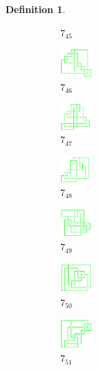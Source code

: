 \documentclass{article}
\theoremstyle{definition}
\newtheorem{defn}[thm]{Definition}
\theoremstyle{theorem}
\theoremstyle{proposition}
\theoremstyle{corollary}
\begin{document}
\begin{defn}
\begin{figure}[H]
\begin{subfigure}{0.075\textwidth}
    \caption{$7_{45}$} 
    \end{subfigure}
    \begin{subfigure}{0.075\textwidth}
    \includegraphics[width=1.25cm]{../Midterm_Poster/grid_diagram/theta_7_46.png}
    \caption{$7_{46}$} 
    \end{subfigure}
    \begin{subfigure}{0.075\textwidth}
    \includegraphics[width=1.25cm]{../Midterm_Poster/grid_diagram/theta_7_47.png}
    \caption{$7_{47}$} 
    \end{subfigure}
    \begin{subfigure}{0.075\textwidth}
    \includegraphics[width=1.25cm]{../Midterm_Poster/grid_diagram/theta_7_48.png}
    \caption{$7_{48}$} 
    \end{subfigure}
    \begin{subfigure}{0.075\textwidth}
    \includegraphics[width=1.25cm]{../Midterm_Poster/grid_diagram/theta_7_49.png}
    \caption{$7_{49}$} 
    \end{subfigure}
    \begin{subfigure}{0.075\textwidth}
    \includegraphics[width=1.25cm]{../Midterm_Poster/grid_diagram/theta_7_50.png}
    \caption{$7_{50}$} 
    \end{subfigure}
    \begin{subfigure}{0.075\textwidth}
    \includegraphics[width=1.25cm]{../Midterm_Poster/grid_diagram/theta_7_51.png}
    \caption{$7_{51}$} 
    \end{subfigure}
    \begin{subfigure}{0.075\textwidth}

\end{subfigure}
\end{figure}
\end{defn}
\end{document}
